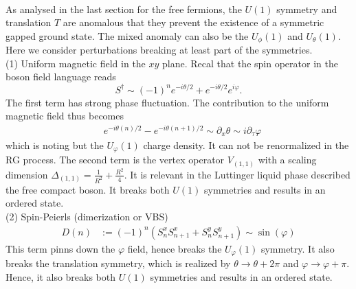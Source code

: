  \\
As analysed in the last section for the free fermions, the $U(1)$ symmetry and translation $T$ are anomalous that they prevent the existence of a symmetric gapped ground state. The mixed anomaly can also be the $U_\phi(1)$ and $U_\theta (1)$. Here we consider perturbations breaking at least part of the symmetries.\\


(1) Uniform magnetic field in the $xy$ plane.
Recal that the spin operator in the boson field language reads
\begin{equation}
	S^\dagger \sim (-1)^n e^{-i\theta/2} + e^{-i\theta/2} e^{i\varphi}.
\end{equation}
The first term has strong phase fluctuation. The contribution to the uniform magnetic field thus becomes
\begin{equation}
	\begin{aligned}
		& e^{-i\theta (n) /2} - e^{-i\theta(n+1)/2} \sim \partial_x \theta \sim i\partial_\tau \varphi
	\end{aligned} 
\end{equation}
which is noting but the $U_\varphi(1)$ charge density. It can not be renormalized in the RG process. The second term is the vertex operator $V_{(1,1)}$ with a scaling dimension $\Delta_{(1,1)} = \frac{1}{R^2} + \frac{R^2}{4}$. It is relevant in the Luttinger liquid phase described the free compact boson. It breaks both $U(1)$ symmetries and results in an ordered state.\\ 
 
(2) Spin-Peierls (dimerization or VBS)
\begin{equation}
	\begin{aligned}
		D(n) & := \left(-1\right)^n \left( S^x_n S^x_{n+1} + S^y_n S^y_{n+1} \right) \sim \sin (\varphi)
	\end{aligned}	
\end{equation}
This term pinns down the $\varphi$ field, hence breaks the $U_\varphi (1)$ symmetry. It also breaks the translation symmetry, which is realized by $\theta \rightarrow \theta + 2\pi$ and $\varphi \rightarrow \varphi + \pi$. Hence, it also breaks both $U(1)$ symmetries and results in an ordered state.

